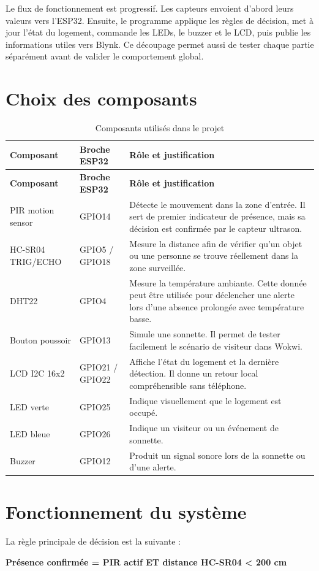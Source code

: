 \documentclass[12pt,a4paper]{report}
\begin{document}
Le flux de fonctionnement est progressif. Les capteurs envoient d'abord leurs valeurs vers l'ESP32. Ensuite, le programme applique les règles de décision, met à jour l'état du logement, commande les LEDs, le buzzer et le LCD, puis publie les informations utiles vers Blynk. Ce découpage permet aussi de tester chaque partie séparément avant de valider le comportement global.

\chapter{Choix des composants}
\begin{longtable}{p{3.5cm}p{3.6cm}p{7cm}}
  \caption{Composants utilisés dans le projet}\\
  \toprule
  \rowcolor{TableHead}
  \textbf{Composant} & \textbf{Broche ESP32} & \textbf{Rôle et justification} \\
  \midrule
  \endfirsthead
  \toprule
  \rowcolor{TableHead}
  \textbf{Composant} & \textbf{Broche ESP32} & \textbf{Rôle et justification} \\
  \midrule
  \endhead
  PIR motion sensor & GPIO14 & Détecte le mouvement dans la zone d'entrée. Il sert de premier indicateur de présence, mais sa décision est confirmée par le capteur ultrason. \\
  HC-SR04 TRIG/ECHO & GPIO5 / GPIO18 & Mesure la distance afin de vérifier qu'un objet ou une personne se trouve réellement dans la zone surveillée. \\
  DHT22 & GPIO4 & Mesure la température ambiante. Cette donnée peut être utilisée pour déclencher une alerte lors d'une absence prolongée avec température basse. \\
  Bouton poussoir & GPIO13 & Simule une sonnette. Il permet de tester facilement le scénario de visiteur dans Wokwi. \\
  LCD I2C 16x2 & GPIO21 / GPIO22 & Affiche l'état du logement et la dernière détection. Il donne un retour local compréhensible sans téléphone. \\
  LED verte & GPIO25 & Indique visuellement que le logement est occupé. \\
  LED bleue & GPIO26 & Indique un visiteur ou un événement de sonnette. \\
  Buzzer & GPIO12 & Produit un signal sonore lors de la sonnette ou d'une alerte. \\
  \bottomrule
\end{longtable}

\chapter{Fonctionnement du système}
La règle principale de décision est la suivante :
\begin{center}
  \textbf{Présence confirmée = PIR actif ET distance HC-SR04 < 200 cm}
\end{center}
\end{document}
